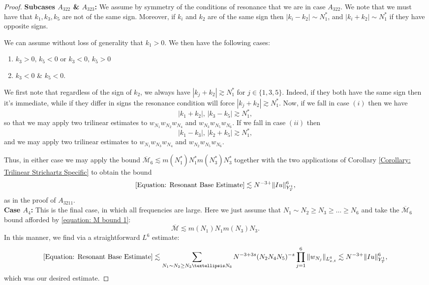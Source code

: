 \documentclass[12pt, letterpaper]{amsart}
\begin{document}
\begin{proof}
    \textbf{Subcases $A_{322}$ \& $A_{323}$: }We assume by symmetry of the conditions of resonance that we are in case $A_{322}$. We note that we must have that $k_1,k_3,k_5$ are not of the same sign. Moreover, if $k_i$ and $k_2$ are of the same sign then $|k_i-k_2|\sim N_1^*$, and $|k_i+k_2|\sim N_{1}^*$ if they have opposite signs. 
    
    We can assume without loss of generality that $k_1 > 0$. We then have the following cases:
    \begin{enumerate}[label = (\roman*)]
        \item $k_3 > 0,\,k_5 < 0$ or $k_3 < 0,\,k_5 > 0$
        \item $k_3 < 0$ \& $k_5 < 0$.
    \end{enumerate}
    We first note that regardless of the sign of $k_2$, we always have $|k_j+k_2|\gtrsim N_1^*$ for $j\in\{1,3,5\}$. Indeed, if they both have the same sign then it's immediate, while if they differ in signs the resonance condition will force $|k_j+k_2|\gtrsim N_1^*$. Now, if we fall in case $(i)$ then we have
    \[
    |k_1+k_2|,\,|k_3-k_5|\gtrsim N_1^*,
    \]
    so that we may apply two trilinear estimates to $w_{N_1}w_{N_2}w_{N_4}$ and $w_{N_3}w_{N_5}w_{N_6}$. If we fall in case $(ii)$ then
    \[
    |k_1-k_3|,\,|k_2+k_5|\gtrsim N_1^*,
    \]
    and we may apply two trilinear estimates to $w_{N_1}w_{N_3}w_{N_4}$ and $w_{N_2}w_{N_5}w_{N_6}$.

    Thus, in either case we may apply the bound $\overline{\mathcal{M}}_6\lesssim m(N_1^*)N_1^*m(N_3^*)N_3^*$ together with the two applications of Corollary \ref{Corollary: Trilinear Strichartz Specific} to obtain the bound
    \[
\eqref{Equation: Resonant Base Estimate}\lesssim N^{-3+}\|Iu\|_{Y^1_T}^6,
    \]
    as in the proof of $A_{3211}$.\\
    \textbf{Case $A_4$:} This is the final case, in which all frequencies are large. Here we just assume that $N_1\sim N_2\geq N_3\geq \dots\geq N_6$ and take the $\overline{\mathcal{M}}_6$ bound afforded by \eqref{equation: M bound 1}:
    \[
    \overline{\mathcal{M}}\lesssim m(N_1)N_1m(N_3)N_3.
    \]
    In this manner, we find via a straightforward $L^6$ estimate:
    \[
        \eqref{Equation: Resonant Base Estimate}\lesssim \sum_{N_1\sim N_2\geq N_3\dots N_6}N^{-3+3s}(N_2N_4N_5)^{-s}\prod_{j=1}^6\|w_{N_j}\|_{L^6_{x,t}}\lesssim N^{-3+}\|Iu\|_{Y^1_T}^6,
    \]
    which was our desired estimate.
\end{proof}
\end{document}

